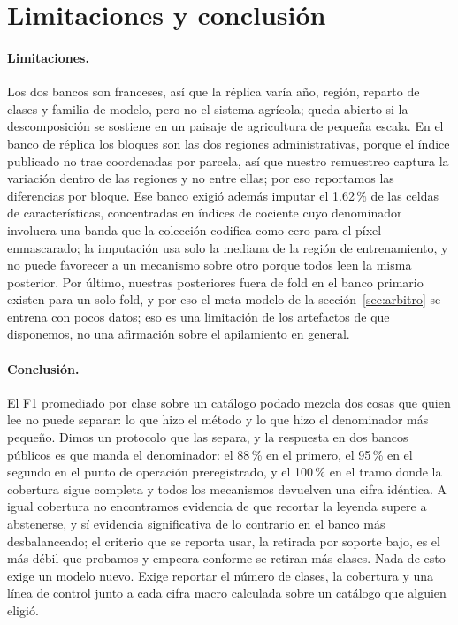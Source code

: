 \section{Limitaciones y conclusión}
\label{sec:conclusion}

\paragraph{Limitaciones.}
Los dos bancos son franceses, así que la réplica varía año, región, reparto de clases y familia de
modelo, pero no el sistema agrícola; queda abierto si la descomposición se sostiene en un paisaje
de agricultura de pequeña escala. En el banco de réplica los bloques son las dos regiones
administrativas, porque el índice publicado no trae coordenadas por parcela, así que nuestro
remuestreo captura la variación dentro de las regiones y no entre ellas; por eso reportamos las
diferencias por bloque. Ese banco exigió además imputar el \num{1.62}\,\% de las celdas de
características, concentradas en índices de cociente cuyo denominador involucra una banda que la
colección codifica como cero para el píxel enmascarado; la imputación usa solo la mediana de la
región de entrenamiento, y no puede favorecer a un mecanismo sobre otro porque todos leen la misma
posterior. Por último, nuestras posteriores fuera de fold en el banco primario existen para un solo
fold, y por eso el meta-modelo de la sección~\ref{sec:arbitro} se entrena con pocos datos; eso es
una limitación de los artefactos de que disponemos, no una afirmación sobre el apilamiento en
general.

\paragraph{Conclusión.}
El F1 promediado por clase sobre un catálogo podado mezcla dos cosas que quien lee no puede
separar: lo que hizo el método y lo que hizo el denominador más pequeño. Dimos un protocolo que las
separa, y la respuesta en dos bancos públicos es que manda el denominador: el \num{88}\,\% en el
primero, el \num{95}\,\% en el segundo en el punto de operación preregistrado, y el \num{100}\,\%
en el tramo donde la cobertura sigue completa y todos los mecanismos devuelven una cifra idéntica.
A igual cobertura no encontramos evidencia de que recortar la leyenda supere a abstenerse, y sí
evidencia significativa de lo contrario en el banco más desbalanceado; el criterio que se reporta
usar, la retirada por soporte bajo, es el más débil que probamos y empeora conforme se retiran más
clases. Nada de esto exige un modelo nuevo. Exige reportar el número de clases, la cobertura y una
línea de control junto a cada cifra macro calculada sobre un catálogo que alguien eligió.
